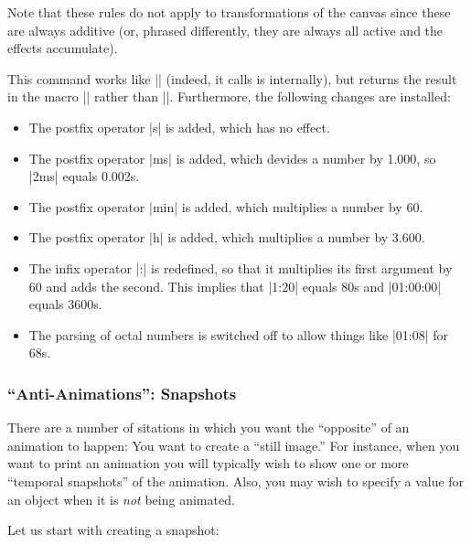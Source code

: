 Note that these rules do not apply to transformations of the canvas
since these are always additive (or, phrased differently, they are
always all active and the effects accumulate).


\begin{command}{\pgfparsetime{}}
  This command works like |\pgfmathparse| (indeed, it calls is
  internally), but returns the result in the macro |\pgftimeresult|
  rather than |\pgfmathresult|. Furthermore, the following changes are
  installed:

  \begin{itemize}
  \item 
    The postfix operator |s| is added, which has no effect.
  \item The postfix operator |ms| is added, which devides a number by
    1.000, so |2ms| equals 0.002s.
  \item
    The postfix operator |min| is added, which multiplies a number by
    60.
  \item The postfix operator |h| is added, which multiplies a number by
    3.600.
  \item The infix operator |:| is redefined, so that it multiplies its
    first argument by 60 and adds the second. This implies that
    |1:20| equals 80s and |01:00:00| equals 3600s.
  \item The parsing of octal numbers is switched off to allow things
    like |01:08| for 68s.
  \end{itemize}
\end{command}




\subsubsection{``Anti-Animations'': Snapshots}

There are a number of sitations in which you want the ``opposite'' of
an animation to happen: You want to create a ``still image.'' For
instance, when you want to print an animation you will typically wish
to show one or more ``temporal snapshots'' of the animation. Also, you
may wish to specify a value for an object when it is \emph{not} being
animated.

Let us start with creating a snapshot:

